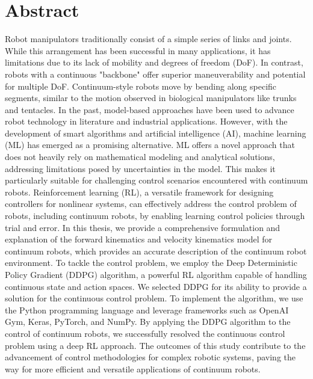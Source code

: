 \documentclass[12pt,twoside,a4]{mwbk}
\begin{document}
\chapter{Abstract}
Robot manipulators traditionally consist of a simple series of links and joints. While this arrangement has been successful in many applications, it has limitations due to its lack of mobility and degrees of freedom (DoF). In contrast, robots with a continuous "backbone" offer superior maneuverability and potential for multiple DoF. Continuum-style robots move by bending along specific segments, similar to the motion observed in biological manipulators like trunks and tentacles. In the past, model-based approaches have been used to advance robot technology in literature and industrial applications. However, with the development of smart algorithms and artificial intelligence (AI), machine learning (ML) has emerged as a promising alternative. ML offers a novel approach that does not heavily rely on mathematical modeling and analytical solutions, addressing limitations posed by uncertainties in the model. This makes it particularly suitable for challenging control scenarios encountered with continuum robots. Reinforcement learning (RL), a versatile framework for designing controllers for nonlinear systems, can effectively address the control problem of robots, including continuum robots, by enabling learning control policies through trial and error. In this thesis, we provide a comprehensive formulation and explanation of the forward kinematics and velocity kinematics model for continuum robots, which provides an accurate description of the continuum robot environment. To tackle the control problem, we employ the Deep Deterministic Policy Gradient (DDPG) algorithm, a powerful RL algorithm capable of handling continuous state and action spaces. We selected DDPG for its ability to provide a solution for the continuous control problem. To implement the algorithm, we use the Python programming language and leverage frameworks such as OpenAI Gym, Keras, PyTorch, and NumPy. By applying the DDPG algorithm to the control of continuum robots, we successfully resolved the continuous control problem using a deep RL approach. The outcomes of this study contribute to the advancement of control methodologies for complex robotic systems, paving the way for more efficient and versatile applications of continuum robots.
\end{document}
